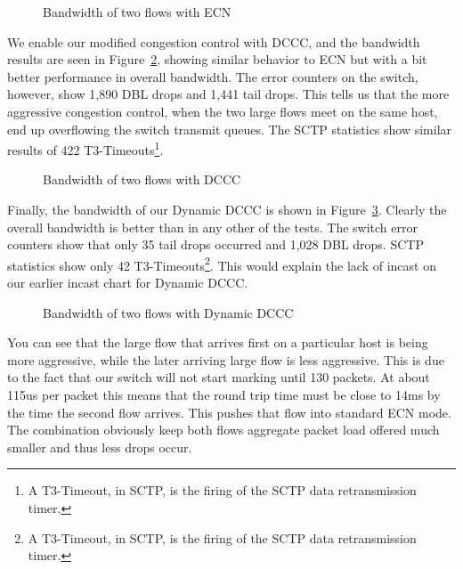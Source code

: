 \documentclass[12pt]{article}
\begin{document}
\begin{figure}[h]
\centering
{}
\caption{Bandwidth of two flows with ECN}
\label{fig:ecnBw}
\end{figure}


\newpage

We enable our modified congestion control with DCCC, and the bandwidth
results are seen in Figure~\ref{fig:dcccBw}, showing similar behavior to ECN but with a bit better performance in
overall bandwidth. The error counters on the switch, however,
show 1,890 DBL drops and 1,441 tail drops. This tells us that  the more aggressive congestion
control, when the two large flows meet on the same host, end up overflowing the switch
transmit queues. The SCTP statistics show similar results of 422 
T3-Timeouts\footnote{A T3-Timeout, in SCTP, is the firing of the SCTP data retransmission timer.}. 


\begin{figure}[h]
\centering
{}
\caption{Bandwidth of two flows with DCCC}
\label{fig:dcccBw}
\end{figure}


\newpage

Finally, the bandwidth of our Dynamic DCCC is shown in Figure~\ref{fig:dynBw}. Clearly the
overall bandwidth is better than in any other of the tests. The switch error counters show that only 35 tail
drops occurred and 1,028 DBL drops. SCTP statistics show only 42 T3-Timeouts\footnote{A T3-Timeout, in SCTP, is the firing of the SCTP data retransmission timer.}. 
This would explain the lack of incast on our earlier incast chart for Dynamic DCCC.

\begin{figure}[h]
\centering
{}
\caption{Bandwidth of two flows with Dynamic DCCC}
\label{fig:dynBw}
\end{figure}


You can see that the large flow that arrives first on a particular
host is being more aggressive, while the later arriving large flow is less aggressive. This is due to
the fact that our switch will not start marking until 130 packets. At about 115us per packet this means
that the round trip time must be close to 14ms by the time the second flow arrives. This pushes that
flow into standard ECN mode. The combination obviously keep both flows aggregate packet load
offered much smaller and thus less drops occur.
\end{document}
